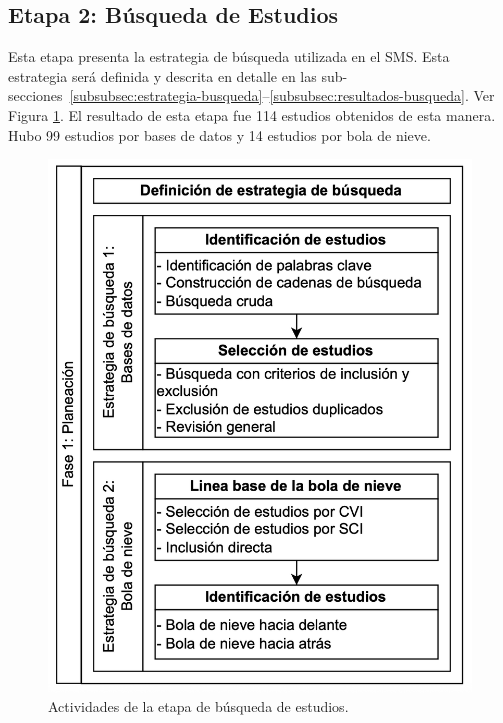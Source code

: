 \newcommand{\totalStudies}{114}
\newcommand{\databaseStudies}{99}
\newcommand{\snowballStudies}{14}
\newcommand{\directInclusionStudies}{0}



\subsection{Etapa 2: Búsqueda de Estudios}

Esta etapa presenta la estrategia de búsqueda utilizada en el SMS. Esta estrategia será definida y descrita en detalle en las sub-secciones~\ref{subsubsec:estrategia-busqueda}--\ref{subsubsec:resultados-busqueda}. Ver Figura \ref{fig:busqueda-estudios}.
El resultado de esta etapa fue \totalStudies{} estudios obtenidos de esta manera. Hubo \databaseStudies{} estudios por bases de datos y  \snowballStudies{} estudios por bola de nieve.


\begin{figure}[htbp]
	\centering
	\vspace{10pt}
	\includegraphics[scale=0.33]{resources/figures/fig03-fase1-planeacion.png}
	\caption{Actividades de la etapa de búsqueda de estudios.}
	\label{fig:busqueda-estudios}
\end{figure}

